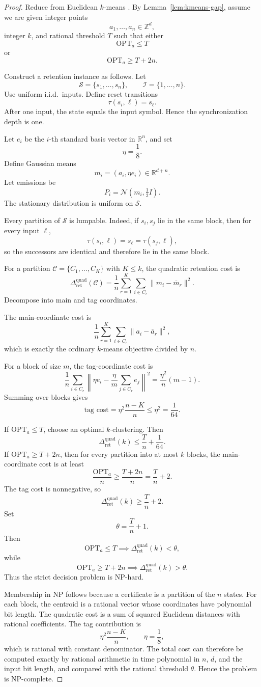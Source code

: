 \documentclass[12pt]{article}
\theoremstyle{definition}
\newcommand{\RetQuad}{\Delta_{\mathrm{ret}}^{\mathrm{quad}}}
\begin{document}
\begin{proof}
Reduce from Euclidean $k$-means \cite{aloise2009}.  By Lemma~\ref{lem:kmeans-gap}, assume we are
given integer points
\[
a_1,\dots,a_n\in\mathbb Z^d,
\]
integer $k$, and rational threshold $T$ such that either
\[
\mathrm{OPT}_a\le T
\]
or
\[
\mathrm{OPT}_a\ge T+2n.
\]

Construct a retention instance as follows.  Let
\[
\mathcal S=\{s_1,\dots,s_n\},
\qquad
\mathcal I=\{1,\dots,n\}.
\]
Use uniform i.i.d.\ inputs.  Define reset transitions
\[
\tau(s_i,\ell)=s_\ell.
\]
After one input, the state equals the input symbol.  Hence the synchronization
depth is one.

Let $e_i$ be the $i$-th standard basis vector in $\mathbb R^n$, and set
\[
\eta=\frac18.
\]
Define Gaussian means
\[
m_i=(a_i,\eta e_i)\in\mathbb R^{d+n}.
\]
Let emissions be
\[
P_i=\mathcal N(m_i,\tfrac12 I).
\]
The stationary distribution is uniform on $\mathcal S$.

Every partition of $\mathcal S$ is lumpable.  Indeed, if $s_i,s_j$ lie in the
same block, then for every input $\ell$,
\[
\tau(s_i,\ell)=s_\ell=\tau(s_j,\ell),
\]
so the successors are identical and therefore lie in the same block.

For a partition $\mathcal C=\{C_1,\dots,C_K\}$ with $K\le k$, the quadratic
retention cost is
\[
\RetQuad(\mathcal C)
=
\frac1n
\sum_{r=1}^K
\sum_{i\in C_r}
\|m_i-\bar m_r\|^2.
\]
Decompose into main and tag coordinates.

The main-coordinate cost is
\[
\frac1n
\sum_{r=1}^K
\sum_{i\in C_r}
\|a_i-\bar a_r\|^2,
\]
which is exactly the ordinary $k$-means objective divided by $n$.

For a block of size $m$, the tag-coordinate cost is
\[
\frac1n
\sum_{i\in C_r}
\left\|
\eta e_i-\frac{\eta}{m}\sum_{j\in C_r}e_j
\right\|^2
=
\frac{\eta^2}{n}(m-1).
\]
Summing over blocks gives
\[
\text{tag cost}
=
\eta^2\frac{n-K}{n}
\le
\eta^2
=
\frac1{64}.
\]

If $\mathrm{OPT}_a\le T$, choose an optimal $k$-clustering.  Then
\[
\RetQuad(k)
\le
\frac{T}{n}+\frac1{64}.
\]
If $\mathrm{OPT}_a\ge T+2n$, then for every partition into at most $k$
blocks, the main-coordinate cost is at least
\[
\frac{\mathrm{OPT}_a}{n}
\ge
\frac{T+2n}{n}
=
\frac{T}{n}+2.
\]
The tag cost is nonnegative, so
\[
\RetQuad(k)
\ge
\frac{T}{n}+2.
\]
Set
\[
\theta=\frac{T}{n}+1.
\]
Then
\[
\mathrm{OPT}_a\le T
\implies
\RetQuad(k)<\theta,
\]
while
\[
\mathrm{OPT}_a\ge T+2n
\implies
\RetQuad(k)>\theta.
\]
Thus the strict decision problem is NP-hard.

Membership in NP follows because a certificate is a partition of the $n$
states.  For each block, the centroid is a rational vector whose coordinates
have polynomial bit length.  The quadratic cost is a sum of squared Euclidean
distances with rational coefficients.  The tag contribution is
\[
\eta^2\frac{n-K}{n},
\qquad
\eta=\frac18,
\]
which is rational with constant denominator.  The total cost can therefore be
computed exactly by rational arithmetic in time polynomial in $n$, $d$, and
the input bit length, and compared with the rational threshold $\theta$.
Hence the problem is NP-complete.
\end{proof}
\end{document}
